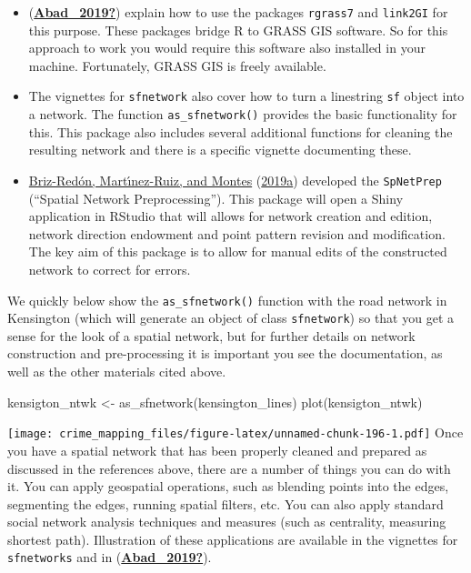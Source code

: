 \documentclass[
  krantz2]{krantz}
\makeatletter
\newenvironment{Shaded}{\begin{snugshade}}{\end{snugshade}}
\newcommand{\FunctionTok}[1]{\textcolor[rgb]{0,0,0}{#1}}
\newcommand{\NormalTok}[1]{#1}
\newcommand{\OtherTok}[1]{\textcolor[rgb]{0.37,0.37,0.37}{#1}}
\providecommand{\tightlist}{%
  \setlength{\itemsep}{0pt}\setlength{\parskip}{0pt}}
\newenvironment{kframe}{%
\medskip{}
\setlength{\fboxsep}{.8em}
 \def\at@end@of@kframe{}%
 \ifinner\ifhmode%
  \def\at@end@of@kframe{\end{minipage}}%
  \begin{minipage}{\columnwidth}%
 \fi\fi%
 \def\FrameCommand##1{\hskip\@totalleftmargin \hskip-\fboxsep
 \colorbox{shadecolor}{##1}\hskip-\fboxsep
     \hskip-\linewidth \hskip-\@totalleftmargin \hskip\columnwidth}%
 \MakeFramed {\advance\hsize-\width
   \@totalleftmargin\z@ \linewidth\hsize
   \@setminipage}}%
 {\par\unskip\endMakeFramed%
 \at@end@of@kframe}
\renewenvironment{Shaded}{\begin{kframe}}{\end{kframe}}
\makeatother
\begin{document}
\begin{itemize}
\tightlist
\item
  (\protect\hyperlink{ref-Abad_2019}{\textbf{Abad\_2019?}}) explain how to use the packages \texttt{rgrass7} and \texttt{link2GI} for this purpose. These packages bridge R to GRASS GIS software. So for this approach to work you would require this software also installed in your machine. Fortunately, GRASS GIS is freely available.
\item
  The vignettes for \texttt{sfnetwork} also cover how to turn a linestring \texttt{sf} object into a network. The function \texttt{as\_sfnetwork()} provides the basic functionality for this. This package also includes several additional functions for cleaning the resulting network and there is a specific vignette documenting these.
\item
  \protect\hyperlink{ref-BrizRedon_2019a}{Briz-Redón, Martı́nez-Ruiz, and Montes} (\protect\hyperlink{ref-BrizRedon_2019a}{2019a}) developed the \texttt{SpNetPrep} (``Spatial Network Preprocessing''). This package will open a Shiny application in RStudio that will allows for network creation and edition, network direction endowment and point pattern revision and modiﬁcation. The key aim of this package is to allow for manual edits of the constructed network to correct for errors.
\end{itemize}

We quickly below show the \texttt{as\_sfnetwork()} function with the road network in Kensington (which will generate an object of class \texttt{sfnetwork}) so that you get a sense for the look of a spatial network, but for further details on network construction and pre-processing it is important you see the documentation, as well as the other materials cited above.

\begin{Shaded}
\begin{Highlighting}[]
\NormalTok{kensigton\_ntwk }\OtherTok{\textless{}{-}} \FunctionTok{as\_sfnetwork}\NormalTok{(kensington\_lines)}
\FunctionTok{plot}\NormalTok{(kensigton\_ntwk)}
\end{Highlighting}
\end{Shaded}

\texttt{[image: crime\_mapping\_files/figure-latex/unnamed-chunk-196-1.pdf]}
Once you have a spatial network that has been properly cleaned and prepared as discussed in the references above, there are a number of things you can do with it. You can apply geospatial operations, such as blending points into the edges, segmenting the edges, running spatial filters, etc. You can also apply standard social network analysis techniques and measures (such as centrality, measuring shortest path). Illustration of these applications are available in the vignettes for \texttt{sfnetworks} and in (\protect\hyperlink{ref-Abad_2019}{\textbf{Abad\_2019?}}).
\end{document}
